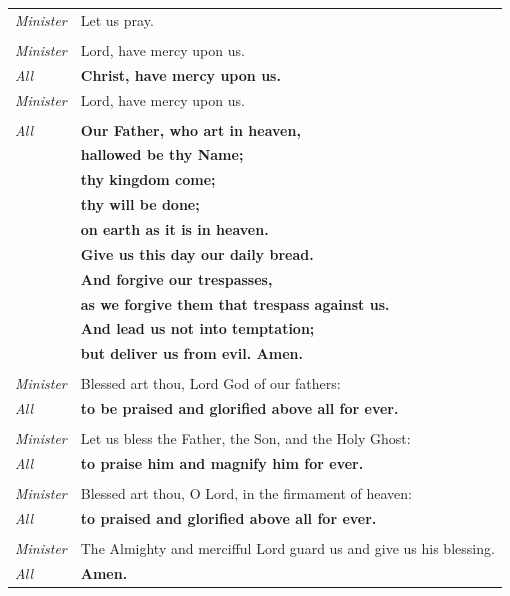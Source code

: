 \documentclass[10pt]{article}
\begin{document}

\begin{tabularx}{\linewidth}{lX}

    \textit{Minister} & Let us pray. \\
    & \\
    \textit{Minister} & Lord, have mercy upon us. \\
    \textit{All} & \textbf{Christ, have mercy upon us.} \\
    \textit{Minister} & Lord, have mercy upon us. \\
    & \\
    \textit{All} & \textbf{Our Father, who art in heaven,} \\
    & \textbf{hallowed be thy Name;} \\
    & \textbf{thy kingdom come;} \\
    & \textbf{thy will be done;} \\
    & \textbf{on earth as it is in heaven.} \\
    & \textbf{Give us this day our daily bread.} \\
    & \textbf{And forgive our trespasses,} \\
    & \textbf{as we forgive them that trespass against us.} \\
    & \textbf{And lead us not into temptation;} \\
    & \textbf{but deliver us from evil. Amen.} \\

    & \\
    \textit{Minister} & Blessed art thou, Lord God of our fathers: \\
    \textit{All} & \textbf{to be praised and glorified above all for ever.} \\
    & \\
    \textit{Minister} & Let us bless the Father, the Son, and the Holy Ghost: \\
    \textit{All} & \textbf{to praise him and magnify him for ever.} \\
    & \\
    \textit{Minister} & Blessed art thou, O Lord, in the firmament of heaven: \\
    \textit{All} & \textbf{to praised and glorified above all for ever.} \\
    & \\
    \textit{Minister} & The Almighty and mercifful Lord guard us and give us his blessing. \\
    \textit{All} & \textbf{Amen.}

\end{tabularx}
\end{document}
